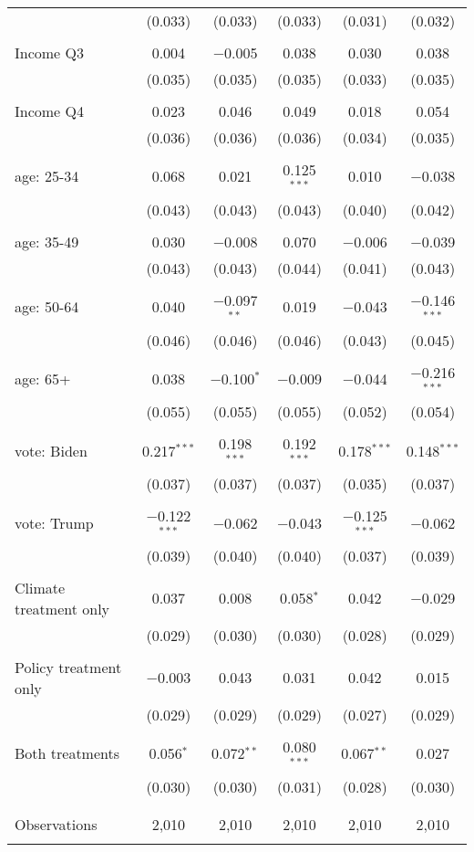 \begin{tabular}{@{\extracolsep{5pt}}lccccc}
  & (0.033) & (0.033) & (0.033) & (0.031) & (0.032) \\ 
  & & & & & \\ 
 Income Q3 & 0.004 & $-$0.005 & 0.038 & 0.030 & 0.038 \\ 
  & (0.035) & (0.035) & (0.035) & (0.033) & (0.035) \\ 
  & & & & & \\ 
 Income Q4 & 0.023 & 0.046 & 0.049 & 0.018 & 0.054 \\ 
  & (0.036) & (0.036) & (0.036) & (0.034) & (0.035) \\ 
  & & & & & \\ 
 age: 25-34 & 0.068 & 0.021 & 0.125$^{***}$ & 0.010 & $-$0.038 \\ 
  & (0.043) & (0.043) & (0.043) & (0.040) & (0.042) \\ 
  & & & & & \\ 
 age: 35-49 & 0.030 & $-$0.008 & 0.070 & $-$0.006 & $-$0.039 \\ 
  & (0.043) & (0.043) & (0.044) & (0.041) & (0.043) \\ 
  & & & & & \\ 
 age: 50-64 & 0.040 & $-$0.097$^{**}$ & 0.019 & $-$0.043 & $-$0.146$^{***}$ \\ 
  & (0.046) & (0.046) & (0.046) & (0.043) & (0.045) \\ 
  & & & & & \\ 
 age: 65+ & 0.038 & $-$0.100$^{*}$ & $-$0.009 & $-$0.044 & $-$0.216$^{***}$ \\ 
  & (0.055) & (0.055) & (0.055) & (0.052) & (0.054) \\ 
  & & & & & \\ 
 vote: Biden & 0.217$^{***}$ & 0.198$^{***}$ & 0.192$^{***}$ & 0.178$^{***}$ & 0.148$^{***}$ \\ 
  & (0.037) & (0.037) & (0.037) & (0.035) & (0.037) \\ 
  & & & & & \\ 
 vote: Trump & $-$0.122$^{***}$ & $-$0.062 & $-$0.043 & $-$0.125$^{***}$ & $-$0.062 \\ 
  & (0.039) & (0.040) & (0.040) & (0.037) & (0.039) \\ 
  & & & & & \\ 
 Climate treatment only & 0.037 & 0.008 & 0.058$^{*}$ & 0.042 & $-$0.029 \\ 
  & (0.029) & (0.030) & (0.030) & (0.028) & (0.029) \\ 
  & & & & & \\ 
 Policy treatment only & $-$0.003 & 0.043 & 0.031 & 0.042 & 0.015 \\ 
  & (0.029) & (0.029) & (0.029) & (0.027) & (0.029) \\ 
  & & & & & \\ 
 Both treatments & 0.056$^{*}$ & 0.072$^{**}$ & 0.080$^{***}$ & 0.067$^{**}$ & 0.027 \\ 
  & (0.030) & (0.030) & (0.031) & (0.028) & (0.030) \\ 
  & & & & & \\ 
\hline \\[-1.8ex] 

Observations & 2,010 & 2,010 & 2,010 & 2,010 & 2,010 \\ 
\hline 
\hline \\[-1.8ex] 
\end{tabular} 